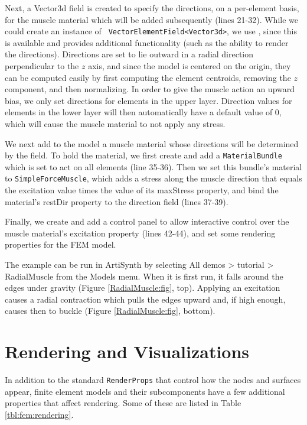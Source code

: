 Next, a Vector3d field is created to specify the directions, on a
per-element basis, for the muscle material which will be added subsequently
(lines 21-32). While we could create an instance of {\tt
VectorElementField<Vector3d>}, we use
, since this
is available and provides additional functionality (such as the
ability to render the directions). Directions are set to lie outward
in a radial direction perpendicular to the $z$ axis, and since the
model is centered on the origin, they can be computed easily by first
computing the element centroids, removing the $z$ component, and then
normalizing. In order to give the muscle action an upward bias, we
only set directions for elements in the upper layer. Direction values
for elements in the lower layer will then automatically have a default
value of 0, which will cause the muscle material to not apply any
stress.

We next add to the model a muscle material whose directions will be
determined by the field. To hold the material, we first create and add
a {\tt MaterialBundle} which is set to act on all elements (line
35-36). Then we set this bundle's material to {\tt SimpleForceMuscle},
which adds a stress along the muscle direction that equals the
excitation value times the value of its {\sf maxStress} property, and
bind the material's {\sf restDir} property to the direction field
(lines 37-39).

Finally, we create and add a control panel to allow interactive
control over the muscle material's excitation property (lines 42-44),
and set some rendering properties for the FEM model.


The example can be run in ArtiSynth by selecting {\sf All demos >
tutorial > RadialMuscle} from the {\sf Models} menu.  When it is first
run, it falls around the edges under gravity (Figure
\ref{RadialMuscle:fig}, top). Applying an excitation causes a radial
contraction which pulls the edges upward and, if high enough, causes
then to buckle (Figure \ref{RadialMuscle:fig}, bottom).


\section{Rendering and Visualizations}
\label{sec:fem:rendering}

In addition to the standard {\tt RenderProps} that control how the
nodes and surfaces appear, finite element models and their subcomponents
have a few additional properties that affect rendering.  Some of these
are listed in Table \ref{tbl:fem:rendering}.

